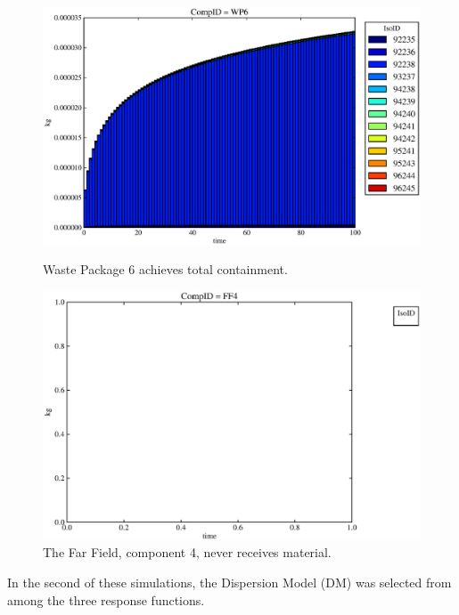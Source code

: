 \begin{figure}[ht]
\begin{minipage}[b]{0.45\linewidth}
\end{minipage}
\hspace{0.05\linewidth}
\begin{minipage}[b]{0.45\linewidth}
  \includegraphics[width=\textwidth]{./chapters/demonstration/base/lpEMII2.eps}
  \caption[Case LPEMII Waste Package Contaminants.]{ 
    Waste Package 6 achieves total containment. 
    }
  \label{fig:lpEMIIwp6}

  \includegraphics[width=\textwidth]{./chapters/demonstration/base/lpEMII0.eps}
  \caption[Case LPEMII Far Field Contaminants.]{ 
    The Far Field, component 4, never receives material.
    }
  \label{fig:lpEMIIff0}


  \end{minipage}
\end{figure}

In the second of these simulations, the Dispersion Model (DM) was 
selected from among the three response functions. 

